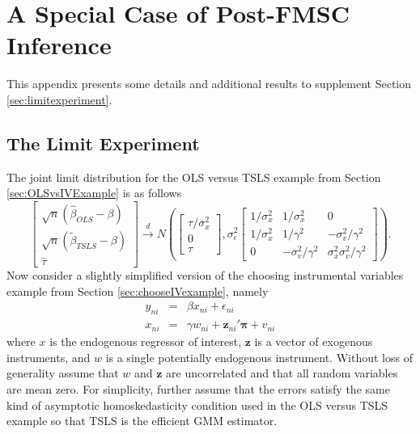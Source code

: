 \section{A Special Case of Post-FMSC Inference}
\label{append:limitexperiment}
This appendix presents some details and additional results to supplement Section \ref{sec:limitexperiment}.

\subsection{The Limit Experiment}
The joint limit distribution for the OLS versus TSLS example from Section \ref{sec:OLSvsIVExample} is as follows
\begin{equation*}
  \left[ 
  \begin{array}{c}
    \sqrt{n} \left( \widehat{\beta}_{OLS} - \beta \right)\\
    \sqrt{n} \left( \widetilde{\beta}_{TSLS} - \beta \right)\\
    \widehat{\tau}
\end{array}
\right] \overset{d}{\rightarrow} N\left( \left[
\begin{array}{c}
  \tau/\sigma_x^2 \\ 0 \\ \tau
\end{array}
\right], \sigma_{\epsilon}^2 
\left[
\begin{array}{ccc}
  1/\sigma_x^2 & 1/\sigma_x^2 & 0\\
  1/\sigma_x^2 & 1/\gamma^2 & -\sigma_v^2/\gamma^2\\
  0 & -\sigma_v^2/\gamma^2 & \sigma_x^2 \sigma_v^2/\gamma^2
\end{array}
\right]\right).
\end{equation*}
Now consider a slightly simplified version of the choosing instrumental variables example from Section \ref{sec:chooseIVexample}, namely
\begin{eqnarray*}
  y_{ni} &=& \beta x_{ni} + \epsilon_{ni}\\
  x_{ni} &=& \gamma w_{ni} + \mathbf{z}_{ni}' \boldsymbol{\pi} + v_{ni}
\end{eqnarray*}
where $x$ is the endogenous regressor of interest, $\mathbf{z}$ is a vector of exogenous instruments, and $w$ is a single potentially endogenous instrument.
Without loss of generality assume that $w$ and $\mathbf{z}$ are uncorrelated and that all random variables are mean zero.
For simplicity, further assume that the errors satisfy the same kind of asymptotic homoskedasticity condition used in the OLS versus TSLS example so that TSLS is the efficient GMM estimator.
